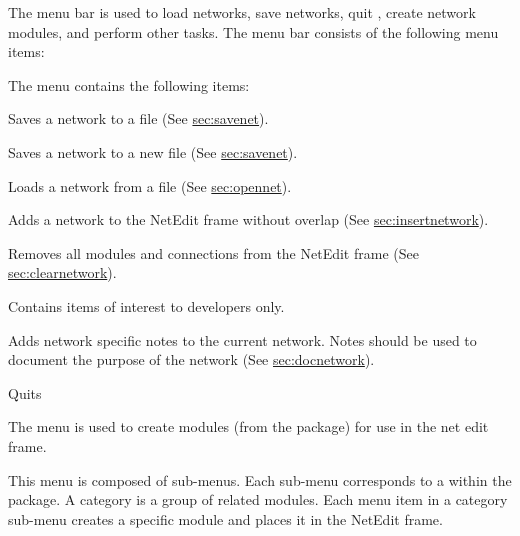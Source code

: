 \begin{description}
   The menu bar is used to load networks, save
  networks, quit \sr{}, create network modules, and perform other
  tasks.  The menu bar consists of the following menu items:

  \begin{description}
     The  menu contains the following items:

    \begin{description}
       Saves a network to a file (See \hyperref{this
        section}{Section~}{}{sec:savenet}).

       Saves a network to a new file (See
      \hyperref{this section}{Section~}{}{sec:savenet}).
      
       Loads a network from a file (See
      \hyperref{this section}{Section~}{}{sec:opennet}).
      
       Adds a network to the NetEdit frame
      without overlap (See \hyperref{this
        section}{Section~}{}{sec:insertnetwork}).
      
       Removes all modules and connections from
      the NetEdit frame (See \hyperref{this
        section}{Section~}{}{sec:clearnetwork}).
      
       Contains items of interest to
      developers only.
      
       Adds network specific
      notes to the current network.  Notes should be used to document
      the purpose of the network (See \hyperref{this
        section}{Section~}{}{sec:docnetwork}).
    
       Quits \sr{}
    \end{description}
  \end{description}
  
  \begin{description}
     The  menu is used to create modules
    (from the \sr{} package) for use in the net edit frame.

    This menu is composed of sub-menus. Each sub-menu corresponds to
     a 
     within the \sr{} package.  A category is a group of
    related modules.  Each menu item in a category sub-menu creates a
    specific module and places it in the NetEdit frame.  
    

\end{description}
\end{description}
